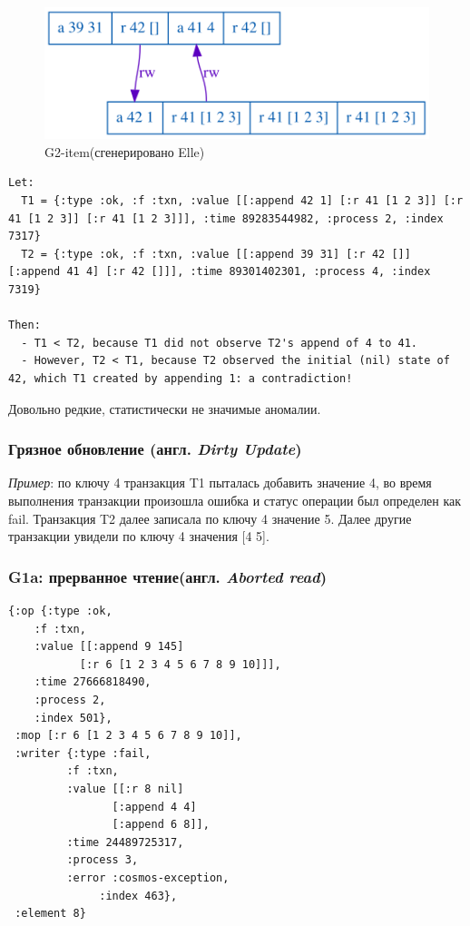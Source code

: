 \documentclass[12pt,  openany]{book}
\begin{document}
\begin{figure}[H]
  \includegraphics[width=\textwidth]{staleness/32.png}
  \caption{G2-item(сгенерировано Elle)}
\end{figure}
\par

\begin{lstlisting}[caption={Пояснение к G2-item аномалии (сгенерировано Elle)}]
Let:
  T1 = {:type :ok, :f :txn, :value [[:append 42 1] [:r 41 [1 2 3]] [:r 41 [1 2 3]] [:r 41 [1 2 3]]], :time 89283544982, :process 2, :index 7317}
  T2 = {:type :ok, :f :txn, :value [[:append 39 31] [:r 42 []] [:append 41 4] [:r 42 []]], :time 89301402301, :process 4, :index 7319}

Then:
  - T1 < T2, because T1 did not observe T2's append of 4 to 41.
  - However, T2 < T1, because T2 observed the initial (nil) state of 42, which T1 created by appending 1: a contradiction!
\end{lstlisting}

\par
Довольно редкие, статистически не значимые аномалии.
\subsubsection{Грязное обновление (англ. \textit{Dirty Update})}
\textit{Пример}: по ключу 4 транзакция T1 пыталась добавить значение 4, во время выполнения транзакции произошла ошибка и статус операции был определен как fail. Транзакция T2 далее записала по ключу 4 значение 5.  Далее другие транзакции увидели по ключу 4 значения [4 5].
\subsubsection{G1a: прерванное чтение(англ. \textit{Aborted read})}
\begin{lstlisting}[caption={Пример G1a аномалии}]
{:op {:type :ok,
	:f :txn,
	:value [[:append 9 145]
		   [:r 6 [1 2 3 4 5 6 7 8 9 10]]],
	:time 27666818490,
	:process 2,
	:index 501},
 :mop [:r 6 [1 2 3 4 5 6 7 8 9 10]],
 :writer {:type :fail,
	     :f :txn,
	     :value [[:r 8 nil]
		        [:append 4 4]
		        [:append 6 8]],
	     :time 24489725317,
	     :process 3,
	     :error :cosmos-exception,
              :index 463},
 :element 8}
\end{lstlisting}
\par
\end{document}
